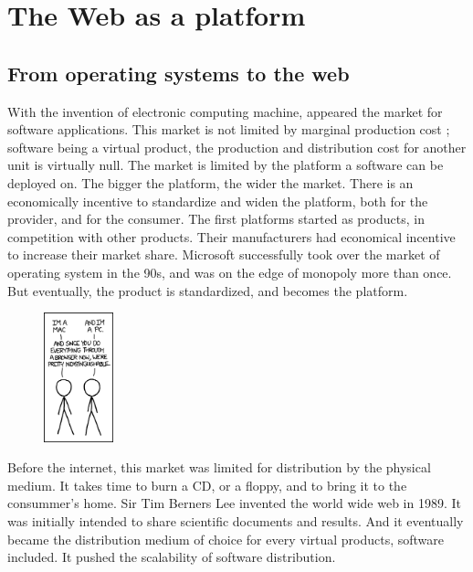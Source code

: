 \section{The Web as a platform}

\subsection{From operating systems to the web}


With the invention of electronic computing machine, appeared the market for software applications.
This market is not limited by marginal production cost ; software being a virtual product, the production and distribution cost for another unit is virtually null.
The market is limited by the platform a software can be deployed on.
The bigger the platform, the wider the market.
There is an economically incentive to standardize and widen the platform, both for the provider, and for the consumer.
The first platforms started as products, in competition with other products.
Their manufacturers had economical incentive to increase their market share.
Microsoft successfully took over the market of operating system in the 90s, and was on the edge of monopoly more than once.
But eventually, the product is standardized, and becomes the platform.

\begin{figure}
  \vspace{-27pt}
  \begin{center}
    \includegraphics[width=0.18\textwidth]{../ressources/Mac-PC.png}
  \end{center}
  \vspace{-20pt}
\end{figure}

Before the internet, this market was limited for distribution by the physical medium.
It takes time to burn a CD, or a floppy, and to bring it to the consummer's home.
Sir Tim Berners Lee invented the world wide web in 1989.
It was initially intended to share scientific documents and results.
And it eventually became the distribution medium of choice for every virtual products, software included.
It pushed the scalability of software distribution.

